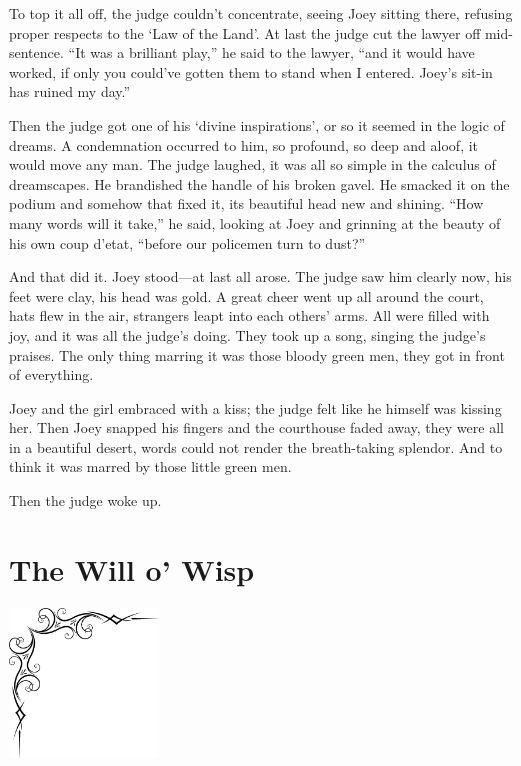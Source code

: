 \documentclass[oneside]{book}
\begin{document}
To top it all off, the judge couldn't concentrate, seeing Joey sitting there,
refusing proper respects to the `Law of the Land'.  At last the judge
cut the lawyer off mid-sentence.  ``It was a brilliant play,'' he said to the
lawyer, ``and it would have worked, if only you could've gotten them
to stand when I entered.  Joey's sit-in has ruined my
day.''

Then the judge got one of his `divine inspirations', or so it seemed in the
logic of dreams.  A condemnation occurred to him, so profound, so
deep and aloof, it would move any man.  The judge laughed, it was all so simple
in the calculus of dreamscapes.  He brandished the handle of his broken gavel.
He smacked it on the podium and somehow that fixed it, its beautiful head
new and shining.  ``How many words will it take,'' he said, looking at Joey
and grinning at the beauty of his own coup d'etat, ``before our policemen
turn to dust?''

And that did it.  Joey stood---at last all arose.
The judge saw him clearly now, his feet were clay, his
head was gold.  A great cheer went up all around the court,
hats flew in the air, strangers leapt into each others' arms.
All were filled with joy, and it was all the judge's doing.  They
took up a song, singing the judge's praises.  The only thing marring
it was those bloody green men, they got in front of everything.

Joey and the girl embraced with a kiss; the judge
felt like he himself was kissing her.  Then Joey snapped his
fingers and the courthouse faded away, they were all in a beautiful
desert, words could not render the breath-taking splendor.
And to think it was marred by those little green men.

Then the judge woke up.




\chapter{The Will o' Wisp}

\vspace{-2in}
\hspace{-.5in}
\includegraphics[width=150px]{ulcorner1.eps}
\end{document}
